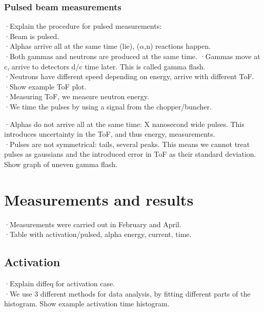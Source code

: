 \documentclass[a4paper,12pt]{report}
\newcommand{\an}{($\alpha$,n) }
\begin{document}
\subsection{Pulsed beam measurements}
·Explain the procedure for pulsed measurements:\\
·Beam is pulsed.\\
·Alphas arrive all at the same time (lie), \an reactions happen.\\
·Both gammas and neutrons are produced at the same time.	%
·Gammas move at c, arrive to detectors d/c time later. This is called gamma flash.\\
·Neutrons have different speed depending on energy, arrive with different ToF.\\
·Show example ToF plot.\\
·Measuring ToF, we measure neutron energy.\\
·We time the pulses by using a signal from the chopper/buncher.	%

·Alphas do not arrive all at the same time: X nanosecond wide pulses. This introduces uncertainty in the ToF, and thus energy, measurements.\\
·Pulses are not symmetrical: tails, several peaks. This means we cannot treat pulses as gaussians and the introduced error in ToF as their standard deviation. Show graph of uneven gamma flash.\\


\chapter{Measurements and results}
·Measurements were carried out in February and April.\\
·Table with activation/pulsed, alpha energy, current, time.\\

\section{Activation}
·Explain diffeq for activation case.\\
·We use 3 different methods for data analysis, by fitting different parts of the histogram. Show example activation time histogram.\\
\end{document}
